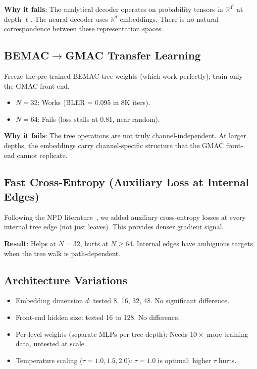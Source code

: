 \documentclass[10pt]{article}
\begin{document}
\textbf{Why it fails}: The analytical decoder operates on probability tensors in $\mathbb{R}^{4^\ell}$ at depth $\ell$. The neural decoder uses $\mathbb{R}^{d}$ embeddings. There is no natural correspondence between these representation spaces.

\subsection{BEMAC$\to$GMAC Transfer Learning}

Freeze the pre-trained BEMAC tree weights (which work perfectly); train only the GMAC front-end.

\begin{itemize}[nosep]
    \item $N = 32$: Works (BLER = 0.095 in 8K iters).
    \item $N = 64$: Fails (loss stalls at 0.81, near random).
\end{itemize}

\textbf{Why it fails}: The tree operations are not truly channel-independent. At larger depths, the embeddings carry channel-specific structure that the GMAC front-end cannot replicate.

\subsection{Fast Cross-Entropy (Auxiliary Loss at Internal Edges)}

Following the NPD literature~\cite{crisp2023}, we added auxiliary cross-entropy losses at every internal tree edge (not just leaves). This provides denser gradient signal.

\textbf{Result}: Helps at $N = 32$, hurts at $N \ge 64$. Internal edges have ambiguous targets when the tree walk is path-dependent.

\subsection{Architecture Variations}

\begin{itemize}[nosep]
    \item Embedding dimension $d$: tested 8, 16, 32, 48. No significant difference.
    \item Front-end hidden size: tested 16 to 128. No difference.
    \item Per-level weights (separate MLPs per tree depth): Needs $10\times$ more training data, untested at scale.
    \item Temperature scaling ($\tau = 1.0, 1.5, 2.0$): $\tau = 1.0$ is optimal; higher $\tau$ hurts.
\end{itemize}
\end{document}
